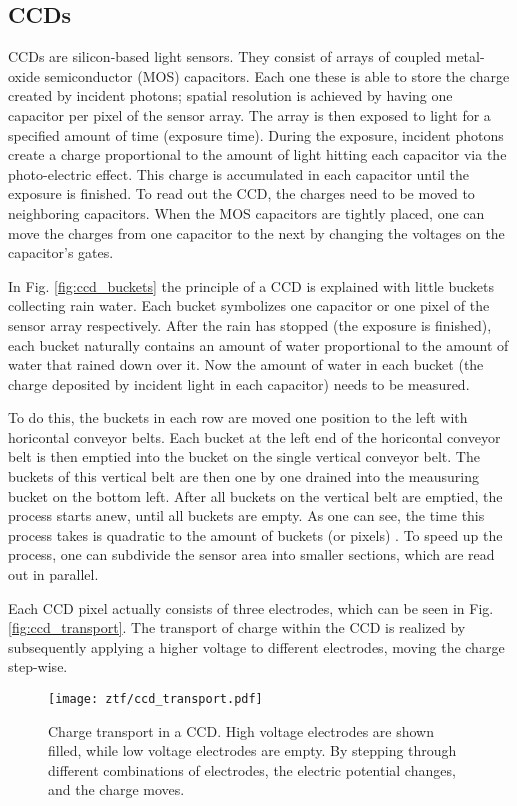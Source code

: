 \subsection{CCDs}
CCDs are silicon-based light sensors. They consist of arrays of coupled metal-oxide semiconductor (MOS) capacitors. Each one these is able to store the charge created by incident photons; spatial resolution is achieved by having one capacitor per pixel of the sensor array. The array is then exposed to light for a specified amount of time (exposure time). During the exposure, incident photons create a charge proportional to the amount of light hitting each capacitor via the photo-electric effect. This charge is accumulated in each capacitor until the exposure is finished. To read out the CCD, the charges need to be moved to neighboring capacitors. When the MOS capacitors are tightly placed, one can move the charges from one capacitor to the next by changing the voltages on the capacitor's gates.

In Fig. \ref{fig:ccd_buckets} the principle of a CCD is explained with little buckets collecting rain water. Each bucket symbolizes one capacitor or one pixel of the sensor array respectively. After the rain has stopped (the exposure is finished), each bucket naturally contains an amount of water proportional to the amount of water that rained down over it. Now the amount of water in each bucket (the charge deposited by incident light in each capacitor) needs to be measured.

To do this, the buckets in each row are moved one position to the left with horicontal conveyor belts. Each bucket at the left end of the horicontal conveyor belt is then emptied into the bucket on the single vertical conveyor belt. The buckets of this vertical belt are then one by one drained into the meausuring bucket on the bottom left. After all buckets on the vertical belt are emptied, the process starts anew, until all buckets are empty. As one can see, the time this process takes is quadratic to the amount of buckets (or pixels) . To speed up the process, one can subdivide the sensor area into smaller sections, which are read out in parallel.

Each CCD pixel actually consists of three electrodes, which can be seen in Fig. \ref{fig:ccd_transport}. The transport of charge within the CCD is realized by subsequently applying a higher voltage to different electrodes, moving the charge step-wise. 

\begin{figure}[htb]
    \texttt{[image: ztf/ccd\_transport.pdf]}
    \caption[Charge transport in a CCD]{Charge transport in a CCD. High voltage electrodes are shown filled, while low voltage electrodes are empty. By stepping through different combinations of electrodes, the electric potential changes, and the charge moves.}
\end{figure}

